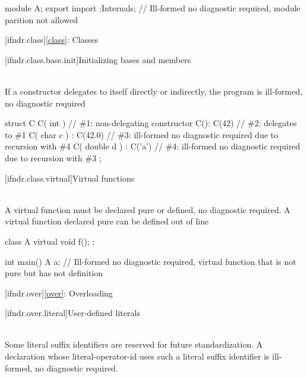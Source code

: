 \pnum
\begin{example}
\begin{codeblock}
module A;
export import :Internals; // Ill-formed no diagnostic required, module parition not allowed
\end{codeblock}
\end{example}


[ifndr.class]{\ref{class}: Classes}

[ifndr.class.base.init]{Initializing bases and members}

\pnum
{} \\
If a constructor delegates to itself directly or indirectly,
the program is ill-formed, no diagnostic required

\pnum
\begin{example}
\begin{codeblock}
struct C {
  C( int ) { } // \#1: non-delegating constructor
  C(): C(42) { } // \#2: delegates to \#1
  C( char c ) : C(42.0) { } // \#3: ill-formed no diagnostic required due to recursion with \#4
  C( double d ) : C('a') { } // \#4: ill-formed no diagnostic required due to recursion with \#3
};
\end{codeblock}
\end{example}


[ifndr.class.virtual]{Virtual functions}

\pnum
{} \\
A virtual function must be declared pure or defined, no diagnostic required. A virtual function declared pure can be defined
out of line

\pnum
\begin{example}
\begin{codeblock}
class A {
  virtual void f();
};

int main() {
    A a; // Ill-formed no diagnostic required, virtual function that is not pure but has not definition
}
\end{codeblock}
\end{example}


[ifndr.over]{\ref{over}: Overloading}

[ifndr.over.literal]{User-defined literals}

\pnum
{} \\
Some literal suffix identifiers are
reserved for future standardization. A declaration whose literal-operator-id uses such a literal
suffix identifier is ill-formed, no diagnostic required.

